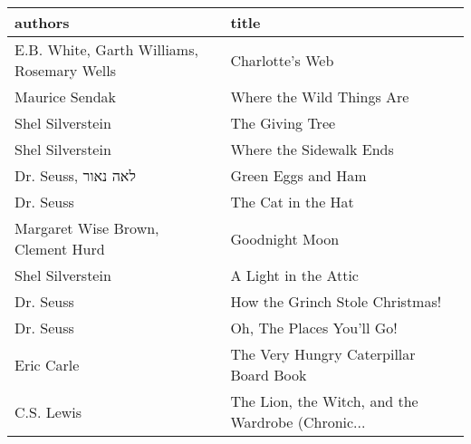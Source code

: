 \begin{tabular}{ll}
\toprule
                                    authors &                                              title \\
\midrule
 E.B. White, Garth Williams, Rosemary Wells &                                    Charlotte's Web \\
                             Maurice Sendak &                          Where the Wild Things Are \\
                           Shel Silverstein &                                    The Giving Tree \\
                           Shel Silverstein &                            Where the Sidewalk Ends \\
                        Dr. Seuss, לאה נאור &                                 Green Eggs and Ham \\
                                  Dr. Seuss &                                 The Cat in the Hat \\
          Margaret Wise Brown, Clement Hurd &                                     Goodnight Moon \\
                           Shel Silverstein &                               A Light in the Attic \\
                                  Dr. Seuss &                    How the Grinch Stole Christmas! \\
                                  Dr. Seuss &                          Oh, The Places You'll Go! \\
                                 Eric Carle &             The Very Hungry Caterpillar Board Book \\
                                 C.S. Lewis &  The Lion, the Witch, and the Wardrobe (Chronic... \\
\bottomrule
\end{tabular}
